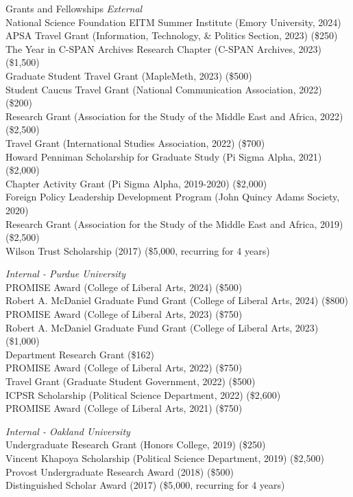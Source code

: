 \documentclass{resume} %
\begin{document}
\begin{rSection}{Grants and Fellowships}
{\it External}
\\National Science Foundation EITM Summer Institute (Emory University, 2024)
\\APSA Travel Grant (Information, Technology, \& Politics Section, 2023) (\$250)
\\The Year in C-SPAN Archives Research Chapter (C-SPAN Archives, 2023) (\$1,500)
\\Graduate Student Travel Grant (MapleMeth, 2023) (\$500)
\\Student Caucus Travel Grant (National Communication Association, 2022) (\$200)
\\Research Grant (Association for the Study of the Middle East and Africa, 2022) (\$2,500)
\\Travel Grant (International Studies Association, 2022) (\$700)
\\Howard Penniman Scholarship for Graduate Study (Pi Sigma Alpha, 2021) (\$2,000)
\\Chapter Activity Grant (Pi Sigma Alpha, 2019-2020) (\$2,000)
\\Foreign Policy Leadership Development Program (John Quincy Adams Society, 2020)
\\Research Grant (Association for the Study of the Middle East and Africa, 2019) (\$2,500)
\\Wilson Trust Scholarship (2017) (\$5,000, recurring for 4 years)

{\it Internal - Purdue University}
\\PROMISE Award (College of Liberal Arts, 2024) (\$500)
\\Robert A. McDaniel Graduate Fund Grant (College of Liberal Arts, 2024) (\$800)
\\PROMISE Award (College of Liberal Arts, 2023) (\$750)
\\Robert A. McDaniel Graduate Fund Grant (College of Liberal Arts, 2023) (\$1,000)
\\Department Research Grant (\$162)
\\PROMISE Award (College of Liberal Arts, 2022) (\$750)
\\Travel Grant (Graduate Student Government, 2022) (\$500)
\\ICPSR Scholarship (Political Science Department, 2022) (\$2,600)
\\PROMISE Award (College of Liberal Arts, 2021) (\$750)

{\it Internal - Oakland University}
\\Undergraduate Research Grant (Honors College, 2019) (\$250)
\\Vincent Khapoya Scholarship (Political Science Department, 2019) (\$2,500)
\\Provost Undergraduate Research Award (2018) (\$500)
\\Distinguished Scholar Award (2017) (\$5,000, recurring for 4 years)

\end{rSection}
\end{document}
